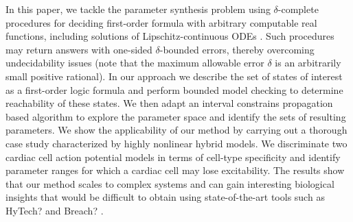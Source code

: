 In this paper, we tackle the parameter synthesis problem using $\delta$-complete procedures \cite{gao12a} 
for deciding first-order formula with arbitrary computable real functions, including solutions 
of Lipschitz-continuous ODEs \citep{gao12b}. Such procedures may return answers with
one-sided $\delta$-bounded errors, thereby overcoming undecidability issues (note that the maximum 
allowable error $\delta$ is an arbitrarily small positive rational). In our approach we describe 
the set of states of interest as a first-order logic formula and perform bounded model checking \cite{BMC}
to determine reachability of these states. We then adapt an interval constrains propagation based algorithm
to explore the parameter space and identify the sets of resulting parameters. 
%
We show the applicability of our method by carrying out a thorough case study characterized by 
highly nonlinear hybrid models. We discriminate two cardiac cell action potential 
models \cite{fenton98,orovio08} in terms of cell-type specificity and identify parameter ranges for which a cardiac cell may lose excitability.
The results show that our method scales to complex systems and can gain interesting biological insights that would be difficult to obtain using state-of-the-art tools such as HyTech? \cite{hytech} and Breach? \cite{breach}.
%




